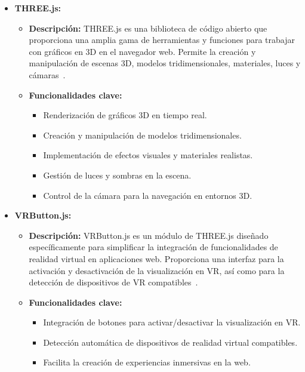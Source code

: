 \documentclass[a4paper, 12pt]{book}
\begin{document}
\begin{itemize}
  \item \textbf{THREE.js:}
    \begin{itemize}
      \item \textbf{Descripción:} THREE.js es una biblioteca de código abierto que proporciona una amplia gama de herramientas y funciones para trabajar 
      con gráficos en 3D en el navegador web. Permite la creación y manipulación de escenas 3D, modelos tridimensionales, materiales, luces y 
      cámaras~\cite{Documentacion_Three.js}.
      \item \textbf{Funcionalidades clave:}
      \begin{itemize}
        \item Renderización de gráficos 3D en tiempo real.
        \item Creación y manipulación de modelos tridimensionales.
        \item Implementación de efectos visuales y materiales realistas.
        \item Gestión de luces y sombras en la escena.
        \item Control de la cámara para la navegación en entornos 3D.
      \end{itemize}
    \end{itemize}
  
  \item \textbf{VRButton.js:}
    \begin{itemize}
      \item \textbf{Descripción:} VRButton.js es un módulo de THREE.js diseñado específicamente para simplificar la integración de funcionalidades de realidad 
      virtual en aplicaciones web. Proporciona una interfaz para la activación y desactivación de la visualización en VR, así como para la detección de dispositivos 
      de VR compatibles~\cite{Documentacion_VR}.
      \item \textbf{Funcionalidades clave:}
      \begin{itemize}
        \item Integración de botones para activar/desactivar la visualización en VR.
        \item Detección automática de dispositivos de realidad virtual compatibles.
        \item Facilita la creación de experiencias inmersivas en la web.
      \end{itemize}
    \end{itemize}
  

\end{itemize}
\end{document}

